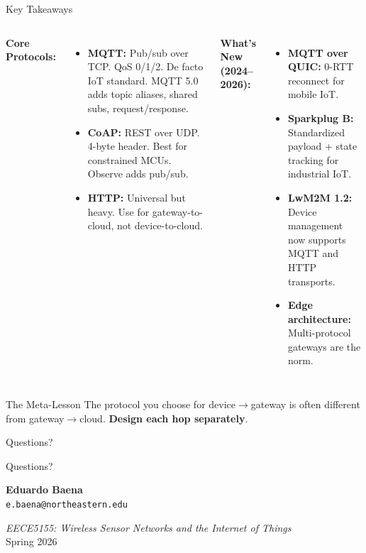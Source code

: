\documentclass[aspectratio=169,11pt]{beamer}
\begin{document}
\begin{frame}{Key Takeaways}
    \begin{columns}
        \textbf{Core Protocols:}
        \begin{itemize}
            \item \textbf{MQTT:} Pub/sub over TCP. QoS 0/1/2. De facto IoT standard. MQTT 5.0 adds topic aliases, shared subs, request/response.
            \item \textbf{CoAP:} REST over UDP. 4-byte header. Best for constrained MCUs. Observe adds pub/sub.
            \item \textbf{HTTP:} Universal but heavy. Use for gateway-to-cloud, not device-to-cloud.
        \end{itemize}
        
        \textbf{What's New (2024--2026):}
        \begin{itemize}
            \item \textbf{MQTT over QUIC:} 0-RTT reconnect for mobile IoT.
            \item \textbf{Sparkplug B:} Standardized payload + state tracking for industrial IoT.
            \item \textbf{LwM2M 1.2:} Device management now supports MQTT and HTTP transports.
            \item \textbf{Edge architecture:} Multi-protocol gateways are the norm.
        \end{itemize}
    \end{columns}
    
    \vspace{0.1cm}
    \begin{alertblock}{The Meta-Lesson}
        The protocol you choose for device$\rightarrow$gateway is often different from gateway$\rightarrow$cloud. \textbf{Design each hop separately}.
    \end{alertblock}
\end{frame}

\begin{frame}{Questions?}
    \begin{center}
        \Huge Questions?
        
        \vspace{1cm}
        \normalsize
        \textbf{Eduardo Baena}\\
        \texttt{e.baena@northeastern.edu}
        
        \vspace{0.5cm}
        \textit{EECE5155: Wireless Sensor Networks and the Internet of Things}\\
        Spring 2026
    \end{center}
\end{frame}
\end{document}
